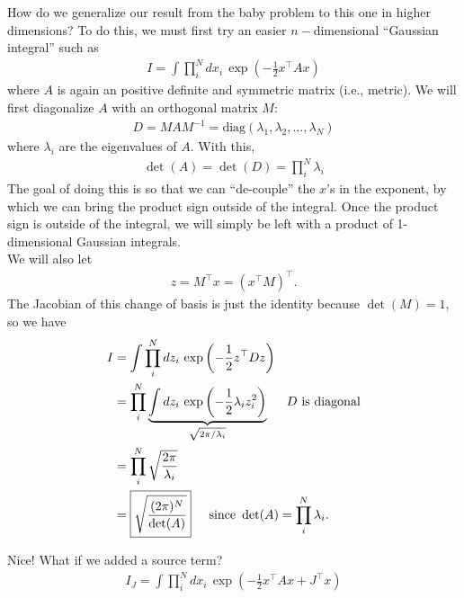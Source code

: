 \documentclass{book}
\theoremstyle{definition}
\newcommand{\f}[2]{\frac{#1}{#2}}
\newcommand{\lp}{\left(}
\newcommand{\rp}{\right)}
\begin{document}
How do we generalize our result from the baby problem to this one in higher dimensions? To do this, we must first try an easier $n-$dimensional ``Gaussian integral'' such as
\begin{align}
I = \int \prod_i^N dx_i\, \exp\lp -\f{1}{2}x^\top A x \rp
\end{align}
where $A$ is again an positive definite and symmetric matrix (i.e., metric). We will first diagonalize $A$ with an orthogonal matrix $M$:
\begin{align}
D = MAM^{-1} = \text{diag}(\lambda_1, \lambda_2, \dots, \lambda_N)
\end{align}
where $\lambda_i$ are the eigenvalues of $A$. With this, 
\begin{align}
\det(A) = \det(D) = \prod_i^N \lambda_i
\end{align}The goal of doing this is so that we can ``de-couple'' the $x$'s in the exponent, by which we can bring the product sign outside of the integral. Once the product sign is outside of the integral, we will simply be left with a product of 1-dimensional Gaussian integrals. \\

We will also let
\begin{align}
z = M^\top x = (x^\top M)^\top.
\end{align}
The Jacobian of this change of basis is just the identity because $\det(M) = 1$, so we have
\begin{align}
I 
&= \int \prod_i^N dz_i\, \exp\lp -\f{1}{2}z^\top D z \rp \\ 
&= \prod_i^N \underbrace{\int dz_i\, \exp\lp -\f{1}{2}\lambda_i z_i^2\rp}_{\sqrt{2\pi / \lambda_i}} \hspace{0.5cm} D\text{ is diagonal}\\ 
&= \prod_i^N \sqrt{\f{2\pi}{  \lambda_i}}\\
&= \boxed{\sqrt{\f{(2\pi)^N}{\det(A)}}} \hspace{0.5cm}\text{since } \det(A) = \prod_i^N \lambda_i.
\end{align}

Nice! What if we added a source term? 
\begin{align}
I_J = \int \prod_i^N dx_i\, \exp\lp -\f{1}{2}x^\top A x + J^\top x \rp
\end{align}
\end{document}
